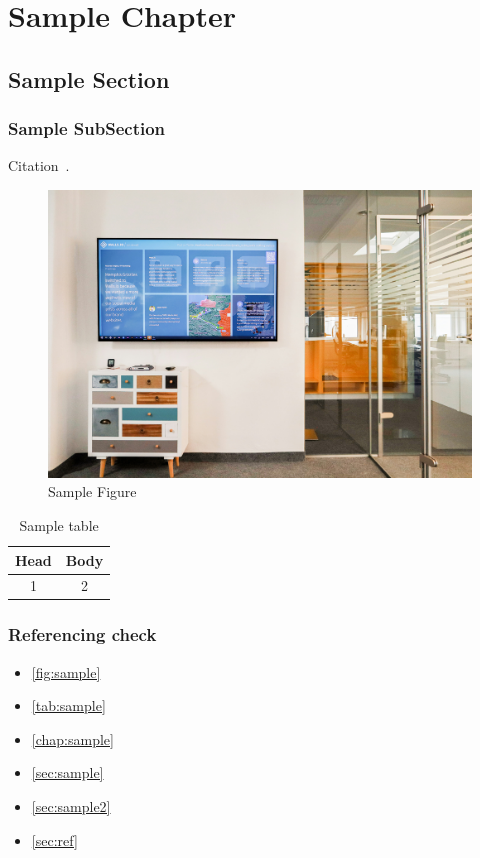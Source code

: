 \chapter{Sample Chapter}\label{chap:sample}

\noindent \lipsum[2-4]

\section{Sample Section}\label{sec:sample}

\lipsum[2-4]

\subsection{Sample SubSection}\label{sec:sample2}

Citation~\cite{kim:responsive2021}. 

\lipsum[2-4]

\begin{figure}[t]
    \centering
    \includegraphics[width=\textwidth]{figures/sample.jpg}
    \caption{Sample Figure}
    \label{fig:sample}
\end{figure}

\begin{table}[t]
    \centering
    \begin{tabular}{c|c}
    \toprule
        Head & Body \\
    \midrule
        1 & 2 \\
    \bottomrule
    \end{tabular}
    \caption{Sample table}
    \label{tab:sample}
\end{table}

\subsection{Referencing check}\label{sec:ref}

\begin{itemize}
    \item \autoref{fig:sample}
    \item \autoref{tab:sample}
    \item \autoref{chap:sample}
    \item \autoref{sec:sample}
    \item \autoref{sec:sample2}
    \item \autoref{sec:ref}
\end{itemize}

\lipsum[2-4]